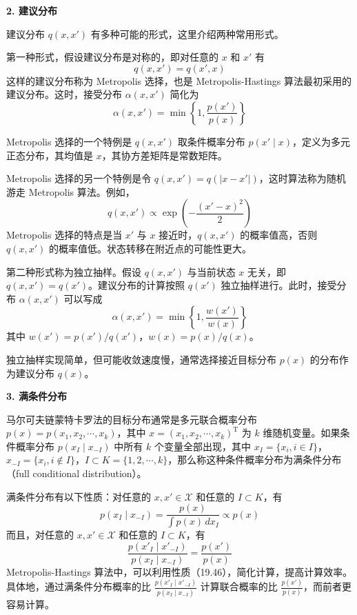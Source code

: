 \documentclass[UTF8,12pt,a4paper,fontset=fandol]{ctexart}
\begin{document}
\noindent\textbf{2. 建议分布}

建议分布 $q(x,x')$ 有多种可能的形式，这里介绍两种常用形式。

第一种形式，假设建议分布是对称的，即对任意的 $x$ 和 $x'$ 有
\begin{equation}
q(x,x')=q(x',x)
\tag{19.42}
\end{equation}
这样的建议分布称为 Metropolis 选择，也是 Metropolis-Hastings 算法最初采用的建议分布。这时，接受分布 $\alpha(x,x')$ 简化为
\begin{equation}
\alpha(x,x')=\min\left\{1,\frac{p(x')}{p(x)}\right\}
\tag{19.43}
\end{equation}

Metropolis 选择的一个特例是 $q(x,x')$ 取条件概率分布 $p(x'\mid x)$，定义为多元正态分布，其均值是 $x$，其协方差矩阵是常数矩阵。

Metropolis 选择的另一个特例是令 $q(x,x')=q(|x-x'|)$，这时算法称为随机游走 Metropolis 算法。例如，
\[
q(x,x')\propto \exp\left(-\frac{(x'-x)^2}{2}\right)
\]
Metropolis 选择的特点是当 $x'$ 与 $x$ 接近时，$q(x,x')$ 的概率值高，否则 $q(x,x')$ 的概率值低。状态转移在附近点的可能性更大。

第二种形式称为独立抽样。假设 $q(x,x')$ 与当前状态 $x$ 无关，即 $q(x,x')=q(x')$。建议分布的计算按照 $q(x')$ 独立抽样进行。此时，接受分布 $\alpha(x,x')$ 可以写成
\begin{equation}
\alpha(x,x')=\min\left\{1,\frac{w(x')}{w(x)}\right\}
\tag{19.44}
\end{equation}
其中 $w(x')=p(x')/q(x')$，$w(x)=p(x)/q(x)$。

独立抽样实现简单，但可能收敛速度慢，通常选择接近目标分布 $p(x)$ 的分布作为建议分布 $q(x)$。

\noindent\textbf{3. 满条件分布}

马尔可夫链蒙特卡罗法的目标分布通常是多元联合概率分布 $p(x)=p(x_1,x_2,\cdots,x_k)$，其中 $x=(x_1,x_2,\cdots,x_k)^{\mathrm{T}}$ 为 $k$ 维随机变量。如果条件概率分布 $p(x_I\mid x_{-I})$ 中所有 $k$ 个变量全部出现，其中 $x_I=\{x_i,i\in I\}$，$x_{-I}=\{x_i,i\notin I\}$，$I\subset K=\{1,2,\cdots,k\}$，那么称这种条件概率分布为满条件分布（full conditional distribution）。

满条件分布有以下性质：对任意的 $x,x'\in\mathcal{X}$ 和任意的 $I\subset K$，有
\begin{equation}
p(x_I\mid x_{-I})=\frac{p(x)}{\displaystyle\int p(x)\,dx_I}\propto p(x)
\tag{19.45}
\end{equation}
而且，对任意的 $x,x'\in\mathcal{X}$ 和任意的 $I\subset K$，有
\begin{equation}
\frac{p(x'_I\mid x'_{-I})}{p(x_I\mid x_{-I})}=\frac{p(x')}{p(x)}
\tag{19.46}
\end{equation}
Metropolis-Hastings 算法中，可以利用性质（19.46），简化计算，提高计算效率。具体地，通过满条件分布概率的比 $\frac{p(x'_I\mid x'_{-I})}{p(x_I\mid x_{-I})}$ 计算联合概率的比 $\frac{p(x')}{p(x)}$，而前者更容易计算。
\end{document}
